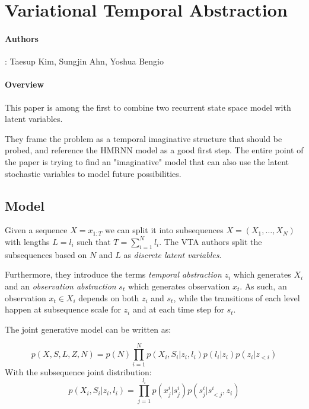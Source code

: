 

\section{Variational Temporal Abstraction}\label{sec:VTA}
\paragraph{Authors}: Taesup Kim, Sungjin Ahn, Yoshua Bengio \cite{kim_variational_2019} \\



\paragraph{Overview} %
\label{par:Overview}
This paper is among the first to combine two recurrent state space model with latent variables. 

They frame the problem as a temporal imaginative structure that should be probed, and reference the HMRNN model as a good first step.
The entire point of the paper is trying to find an "imaginative" model that can also use the latent stochastic variables to model future possibilities. 




\subsection{Model} %
\label{sub:VTA-Model}

Given a sequence \(X = x_{1:T} \) we can split it into subsequences \(X = (X_1, \dots , X_N) \) with lengths \(L={l_i}\) such that \(T=\sum^N_{i=1}l_i\). 
The VTA authors split the subsequences based on $N$ and $L$ as \textit{discrete latent variables}. 

Furthermore, they introduce the terms \textit{temporal abstraction} $z_i$ which generates $X_i$ and an \textit{observation abstraction} $s_t$ which generates observation $x_t$.
As such, an observation $x_t\in X_i$ depends on both $z_i$ and $s_t$, while the transitions of each level happen at subsequence scale for $z_i$ and at each time step for $s_t$. 

The joint generative model can be written as:

\begin{equation}
    p(X,S,L,Z,N) = p(N)
    \prod_{i=1}^N
    p(X_i,S_i|z_i, l_i)
    p(l_i|z_i)
    p(z_i|z_{<i})
    \label{eq:vta-generative}
\end{equation}
With the subsequence joint distribution:
\begin{equation}
    p(X_i,S_i|z_i,l_i) = 
    \prod^{l_i}_{j=1}
    p(x^i_j|s^i_j)
    p(s^i_j|s^i_{<j}, z_i)
    \label{eq:vta-subseq-joint}
\end{equation}

